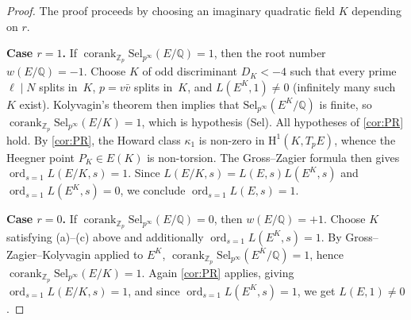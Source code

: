 \begin{proof}
  The proof proceeds by choosing an imaginary quadratic field $K$ depending on $r$.

  \textbf{Case $r = 1$.}
  If $\operatorname{corank}_{\mathbb{Z}_p} \mathrm{Sel}_{p^\infty}(E/\mathbb{Q}) = 1$,
  then the root number $w(E/\mathbb{Q}) = -1$.
  Choose $K$ of odd discriminant $D_K < -4$ such that every prime $\ell \mid N$
  splits in~$K$, $p = v\bar{v}$ splits in~$K$, and $L(E^K, 1) \neq 0$
  (infinitely many such $K$ exist). Kolyvagin's theorem then implies that
  $\mathrm{Sel}_{p^\infty}(E^K/\mathbb{Q})$ is finite, so
  $\operatorname{corank}_{\mathbb{Z}_p} \mathrm{Sel}_{p^\infty}(E/K) = 1$,
  which is hypothesis (Sel). All hypotheses of \cref{cor:PR} hold.
  By \cref{cor:PR}, the Howard class $\kappa_1$ is non-zero in
  $\mathrm{H}^1(K, T_p E)$, whence the Heegner point $P_K \in E(K)$
  is non-torsion.  The Gross--Zagier formula then gives
  $\operatorname{ord}_{s=1} L(E/K, s) = 1$. Since $L(E/K, s) = L(E, s) L(E^K, s)$
  and $\operatorname{ord}_{s=1} L(E^K, s) = 0$, we conclude
  $\operatorname{ord}_{s=1} L(E, s) = 1$.

  \textbf{Case $r = 0$.}
  If $\operatorname{corank}_{\mathbb{Z}_p} \mathrm{Sel}_{p^\infty}(E/\mathbb{Q}) = 0$,
  then $w(E/\mathbb{Q}) = +1$.
  Choose $K$ satisfying (a)--(c) above and additionally
  $\operatorname{ord}_{s=1} L(E^K, s) = 1$.
  By Gross--Zagier--Kolyvagin applied to $E^K$,
  $\operatorname{corank}_{\mathbb{Z}_p} \mathrm{Sel}_{p^\infty}(E^K/\mathbb{Q}) = 1$,
  hence $\operatorname{corank}_{\mathbb{Z}_p} \mathrm{Sel}_{p^\infty}(E/K) = 1$.
  Again \cref{cor:PR} applies, giving $\operatorname{ord}_{s=1} L(E/K, s) = 1$,
  and since $\operatorname{ord}_{s=1} L(E^K, s) = 1$, we get $L(E, 1) \neq 0$.
\end{proof}

